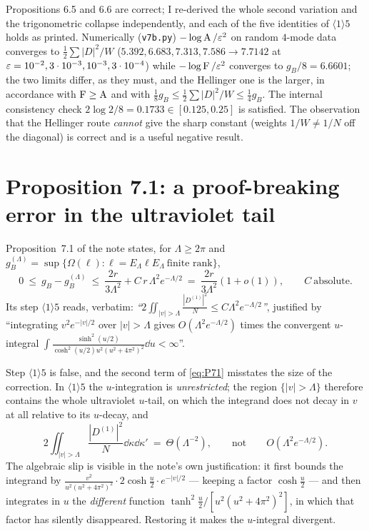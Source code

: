 \documentclass[11pt]{article}
\newcommand{\abs}[1]{\left|#1\right|}
\newcommand{\Hell}{\operatorname{A}}
\theoremstyle{definition}\newtheorem{problem}[theorem]{Problem}
\begin{document}
\begin{verdictok}
Propositions 6.5 and 6.6 are correct; I re-derived the whole second variation and the trigonometric
collapse independently, and each of the five identities of \(\langle1\rangle5\) holds as printed.
Numerically (\texttt{v7b.py}) \(-\log\Hell/\eps^2\) on random \(4\)-mode data converges to
\(\frac12\sum\abs D^2/W\) (\(5.392,6.683,7.313,7.586\to7.7142\) at
\(\varepsilon=10^{-2},3\cdot10^{-3},10^{-3},3\cdot10^{-4}\)) while \(-\log\operatorname{F}/\varepsilon^2\) converges to
\(g_B/8=6.6601\); the two limits differ, as they must, and the Hellinger one is the larger, in
accordance with \(\Fid\ge\Hell\) and with \(\frac18g_B\le\frac12\sum\abs D^2/W\le\frac14g_B\).
The internal consistency check \(2\log2/8=0.1733\in[0.125,0.25]\) is satisfied.  The observation
that the Hellinger route \emph{cannot} give the sharp constant (weights \(1/W\ne1/N\) off the
diagonal) is correct and is a useful negative result.
\end{verdictok}

\section{Proposition 7.1: a proof-breaking error in the ultraviolet tail}\label{sec:P71}

Proposition~7.1 of the note states, for \(\Lambda\ge2\pi\) and
\(g_B^{(\Lambda)}=\sup\{\Omega(\ell):\ell=E_\Lambda\ell E_\Lambda\ \text{finite rank}\}\),
\begin{equation}\label{eq:P71}
 0\ \le\ g_B-g_B^{(\Lambda)}\ \le\ \frac{2r}{3\Lambda^2}+C\,r\,\Lambda^2e^{-\Lambda/2}
 \ =\ \frac{2r}{3\Lambda^2}(1+o(1)),\qquad C\ \text{absolute}.
\end{equation}
Its step \(\langle1\rangle5\) reads, verbatim:
\emph{``\(2\iint_{\abs v>\Lambda}\frac{\abs{D^{(1)}}^2}{N}\le C\Lambda^2e^{-\Lambda/2}\)''}, justified
by ``integrating \(v^2e^{-\abs v/2}\) over \(\abs v>\Lambda\) gives \(O(\Lambda^2e^{-\Lambda/2})\)
times the convergent \(u\)-integral
\(\int\frac{\sinh^2(u/2)}{\cosh^2(u/2)u^2(u^2+4\pi^2)^2}\dd u<\infty\)''.

\begin{issue}\label{iss:P71}
Step \(\langle1\rangle5\) is false, and the second term of \eqref{eq:P71} misstates the size of the
correction.  In \(\langle1\rangle5\) the \(u\)-integration is \emph{unrestricted}; the region
\(\{\abs v>\Lambda\}\) therefore contains the whole ultraviolet \(u\)-tail, on which the integrand
does not decay in \(v\) at all relative to its \(u\)-decay, and
\[
 2\iint_{\abs v>\Lambda}\frac{\abs{D^{(1)}}^2}{N}\dd\kappa\dd\kappa'\ =\ \Theta(\Lambda^{-2}),
 \qquad\text{not}\qquad O(\Lambda^2e^{-\Lambda/2}).
\]
The algebraic slip is visible in the note's own justification: it first bounds the integrand by
\(\frac{v^2}{u^2(u^2+4\pi^2)^2}\cdot 2\cosh\frac u2\cdot e^{-\abs v/2}\) --- keeping a factor
\(\cosh\frac u2\) --- and then integrates in \(u\) the \emph{different} function
\(\tanh^2\frac u2/[u^2(u^2+4\pi^2)^2]\), in which that factor has silently disappeared.  Restoring
it makes the \(u\)-integral divergent.
\end{issue}
\end{document}
